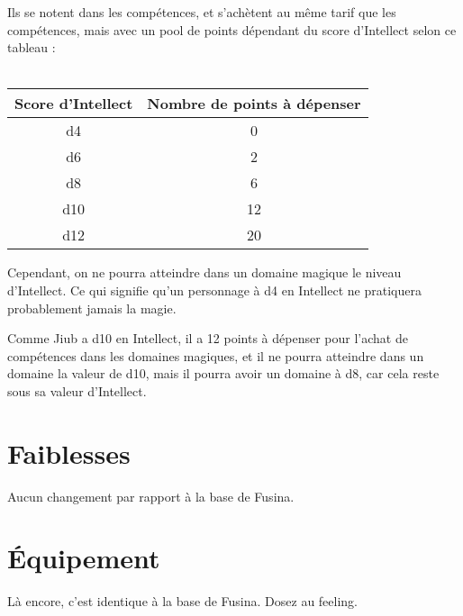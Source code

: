 Ils se notent dans les compétences, et s'achètent au même tarif que les compétences, mais avec un pool de points dépendant du score d'Intellect selon ce tableau :
\\
\\
\begin{tabular}{|c|c|}
    \hline
    Score d'Intellect & Nombre de points à dépenser \\ \hline \hline
    d4 & 0  \\ \hline
    d6 & 2 \\ \hline
    d8 & 6  \\ \hline
    d10 & 12 \\ \hline
    d12 & 20 \\ \hline
\end{tabular}

Cependant, on ne pourra atteindre dans un domaine magique le niveau d'Intellect. Ce qui signifie qu'un personnage à d4 en Intellect ne pratiquera probablement jamais la magie.

{Comme Jiub a d10 en Intellect, il a 12 points à dépenser pour l'achat de compétences dans les domaines magiques, et il ne pourra atteindre dans un domaine la valeur de d10, mais il pourra avoir un domaine à d8, car cela reste sous sa valeur d'Intellect.}

\section{Faiblesses}

Aucun changement par rapport à la base de Fusina.

\section{Équipement}

Là encore, c'est identique à la base de Fusina. Dosez au feeling.
